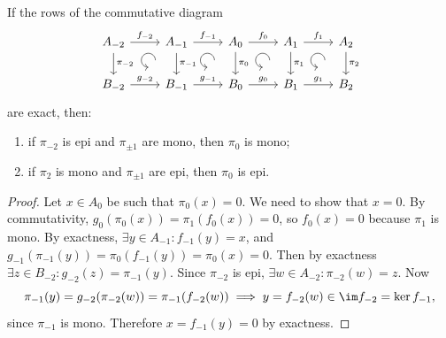 \begin{lem}[5-lemma]\label{5-lemma}
    If the rows of the commutative diagram
    \[\begin{tikzcd}[every matrix/.append style={name=m},   
        execute at end picture={\draw [<-] ([xshift=-8mm,yshift=-10mm]m-1-2.north) arc[start angle=-90,delta angle=-270,radius=0.2cm];
        \draw [<-] ([xshift=-8mm,yshift=-10mm]m-1-3.north) arc[start angle=-90,delta angle=-270,radius=0.2cm];
        \draw [<-] ([xshift=-8mm,yshift=-10mm]m-1-4.north) arc[start angle=-90,delta angle=-270,radius=0.2cm];
        \draw [<-] ([xshift=-8mm,yshift=-10mm]m-1-5.north) arc[start angle=-90,delta angle=-270,radius=0.2cm];}]
        A_{-2}\arrow[r,"f_{-2}"]\arrow[d,"\pi_{-2}"] & A_{-1}\arrow[r,"f_{-1}"]\arrow[d,"\pi_{-1}"] & A_0 \arrow[r,"f_0"]\arrow[d,"\pi_0"] & A_1\arrow[d,"\pi_1"]\arrow[r,"f_1"] & A_2\arrow[d,"\pi_2"] \\
       B_{-2}\arrow[r,"g_{-2}"] & B_{-1}\arrow[r,"g_{-1}"] & B_0\arrow[r,"g_0"] &B_1 \arrow[r,"g_1"] &B_2 
    \end{tikzcd}\]
    are exact, then:
    \begin{enumerate}
        \item if $\pi_{-2}$ is epi and $\pi_{\pm 1}$ are mono, then $\pi_0$ is mono;
        \item if $\pi_2$ is mono and $\pi_{\pm 1}$ are epi, then $\pi_0$ is epi.
    \end{enumerate}
\end{lem}
\begin{proof}
    Let $x\in A_0$ be such that $\pi_0(x)=0$. We need to show that $x=0$. By commutativity, $g_0(\pi_0(x))=\pi_1(f_0(x))=0$, so $f_0(x)=0$ because $\pi_1$ is mono. By exactness, $\exists y\in A_{-1}:f_{-1}(y)=x$, and $g_{-1}(\pi_{-1}(y))=\pi_0(f_{-1}(y))=\pi_0(x)=0$. Then by exactness $\exists z\in B_{-2}:g_{-2}(z)=\pi_{-1}(y)$. Since $\pi_{-2}$ is epi, $\exists w\in A_{-2}:\pi_{-2}(w)=z$. Now 
    \[\pi_{-1}(y)=g_{-2}(\pi_{-2}(w))=\pi_{-1}(f_{-2}(w))\implies y=f_{-2}(w)\in\im f_{-2}=\ker f_{-1},\]
    since $\pi_{-1}$ is mono. Therefore $x=f_{-1}(y)=0$ by exactness.
\end{proof}
